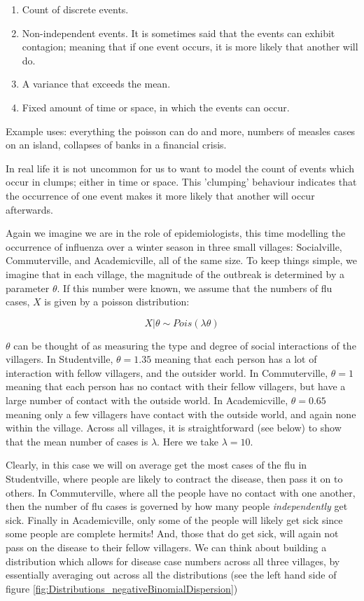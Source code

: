 \documentclass[11pt,fullpage]{book}
\begin{document}
\begin{enumerate} 
\item Count of discrete events.
\item Non-independent events. It is sometimes said that the events can exhibit contagion; meaning that if one event occurs, it is more likely that another will do.
\item A variance that exceeds the mean.
\item Fixed amount of time or space, in which the events can occur.
\end{enumerate}

Example uses: everything the poisson can do and more, numbers of measles cases on an island, collapses of banks in a financial crisis.

In real life it is not uncommon for us to want to model the count of events which occur in clumps; either in time or space. This 'clumping' behaviour indicates that the occurrence of one event makes it more likely that another will occur afterwards. 

Again we imagine we are in the role of epidemiologists, this time modelling the occurrence of influenza over a winter season in three small villages: Socialville, Commuterville, and Academicville, all of the same size. To keep things simple, we imagine that in each village, the magnitude of the outbreak is determined by a parameter $\theta$. If this number were known, we assume that the numbers of flu cases, $X$ is given by a poisson distribution:

\begin{equation}
X|\theta \sim Pois(\lambda\theta)
\end{equation}

$\theta$ can be thought of as measuring the type and degree of social interactions of the villagers. In Studentville, $\theta=1.35$ meaning that each person has a lot of interaction with fellow villagers, and the outsider world. In Commuterville, $\theta=1$ meaning that each person has no contact with their fellow villagers, but have a large number of contact with the outside world. In Academicville, $\theta=0.65$ meaning only a few villagers have contact with the outside world, and again none within the village. Across all villages, it is straightforward (see below) to show that the mean number of cases is $\lambda$. Here we take $\lambda=10$.

Clearly, in this case we will on average get the most cases of the flu in Studentville, where people are likely to contract the disease, then pass it on to others. In Commuterville, where all the people have no contact with one another, then the number of flu cases is governed by how many people \textit{independently} get sick. Finally in Academicville, only some of the people will likely get sick since some people are complete hermits! And, those that do get sick, will again not pass on the disease to their fellow villagers. We can think about building a distribution which allows for disease case numbers across all three villages, by essentially averaging out across all the distributions (see the left hand side of figure \ref{fig:Distributions_negativeBinomialDispersion})
\end{document}
